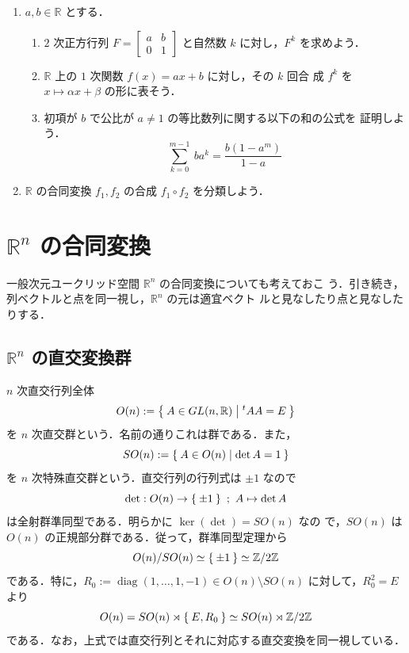 \documentclass[11pt, uplatex, dvipdfmx, titlepage]{jsarticle}
\DeclareMathOperator{\diag}{diag}
\theoremstyle{definition}
\begin{document}
\begin{enumerate}


\item $a, b \in \mathbb{R}$ とする．
  \begin{enumerate}[(1)]

  \item $2$ 次正方行列 $F=\left[
      \begin{array}{cc}
        a & b\\
        0 & 1
      \end{array}
    \right]$ と自然数 $k$ に対し，$F^k$ を求めよう．

  \item $\mathbb{R}$ 上の $1$ 次関数 $f(x) = ax+b$ に対し，その $k$ 回合
  成 $f^k$ を $x \mapsto \alpha x + \beta$ の形に表そう．

\item 初項が $b$ で公比が $a \neq 1$ の等比数列に関する以下の和の公式を
  証明しよう．
  \[
    \sum_{k=0}^{m-1} \ b a^{k} = \frac{b \left( 1-a^m\right)}{1-a}
  \]
  \end{enumerate}

\item $\mathbb{R}$ の合同変換 $f_1, f_2$ の合成 $f_1
  \circ f_2$ を分類しよう．

\end{enumerate}


\newpage

\section{$\mathbb{R}^n$ の合同変換}\label{sec:gendim}

一般次元ユークリッド空間 $\mathbb{R}^n$ の合同変換についても考えておこ
う．引き続き，列ベクトルと点を同一視し，$\mathbb{R}^n$ の元は適宜ベクト
ルと見なしたり点と見なしたりする．

\subsection{$\mathbb{R}^n$ の直交変換群}\label{sec:orthogonal}

$n$ 次直交行列全体
\[
  O(n):=\Set{ A \in GL(n,\mathbb{R}) | {}^{t}A A = E}
\]
を $n$ 次直交群という．名前の通りこれは群である．また，
\[
  SO(n):=\Set{A \in O(n) | \det A=1}
\]
を $n$ 次特殊直交群という．直交行列の行列式は $\pm 1$ なので
\[
  \det : O(n) \to \Set{\pm 1} \ ; \ A \mapsto \det A
\]
は全射群準同型である．明らかに $\ker (\det) = SO(n)$ なの
で，$SO(n)$ は $O(n)$ の正規部分群である．従って，群準同型定理から
\[
  O(n)/SO(n) \simeq \Set{\pm 1} \simeq \mathbb{Z}/2\mathbb{Z}
\]
である．特に，$R_0:=\diag(1,\ldots, 1, -1) \in O(n) \setminus
SO(n)$ に対して，$R_0^2 =E$ より
\[
  O(n) = SO(n) \rtimes \Set{E, R_0} \simeq SO(n) \rtimes \mathbb{Z}/2\mathbb{Z}
\]
である．なお，上式では直交行列とそれに対応する直交変換を同一視している．
\end{document}
